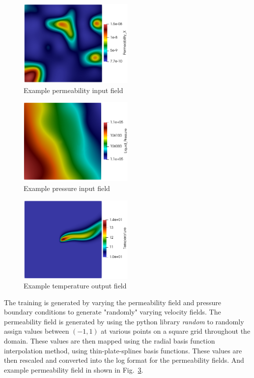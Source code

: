 \documentclass{article} %
\begin{document}
\begin{figure}
\centering
\includegraphics[width=0.5\textwidth]{perm_example.png}
\caption{Example permeability input field}
\label{perm_example}
\end{figure}

\begin{figure}
\centering
\includegraphics[width=0.5\textwidth]{pressure_example.png}
\caption{Example pressure input field}
\label{pressure_example}
\end{figure}

\begin{figure}
\centering
\includegraphics[width=0.5\textwidth]{temp_example.png}
\caption{Example temperature output field}
\label{temp_example}
\end{figure}



The training is generated by varying the permeability field and pressure boundary conditions to generate "randomly" varying velocity fields. The permeability field is generated by using the python library \textit{random} to randomly assign values between $(-1 , 1)$ at various points on a square grid throughout the domain. These values are then mapped using the radial basis function interpolation method, using thin-plate-splines basis functions. These values are then rescaled and converted into the log format for the permeability fields. And example permeability field in shown in Fig.~\ref{temp_example}.
\end{document}
